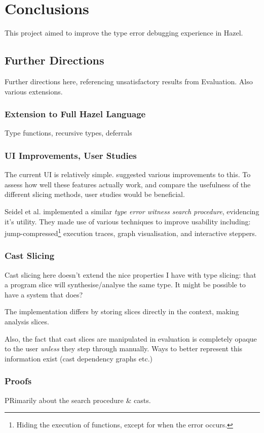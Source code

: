 \chapter{Conclusions}\label{chap:Conclusions}
This project aimed to improve the type error debugging experience in Hazel.

\section{Further Directions}
Further directions here, referencing unsatisfactory results from Evaluation. Also various extensions.
\subsection{Extension to Full Hazel Language}
Type functions, recursive types, deferrals

\subsection{UI Improvements, User Studies}
The current UI is relatively simple.  suggested various improvements to this. To assess how well these features actually work, and compare the usefulness of the different slicing methods, user studies would be beneficial.

Seidel et al. \cite{SearchProc} implemented a similar \textit{type error witness search procedure}, evidencing it's utility. They made use of various techniques to improve usability including: jump-compressed\footnote{Hiding the execution of functions, except for when the error occurs.} execution traces, graph visualisation, and interactive steppers.

\subsection{Cast Slicing}
Cast slicing here doesn't extend the nice properties I have with type slicing: that a program slice will synthesise/analyse the same type. It might be possible to have a system that does?

The implementation differs by storing slices directly in the context, making analysis slices.

Also, the fact that cast slices are manipulated in evaluation is completely opaque to the user \textit{unless} they step through manually. Ways to better represent this information exist (cast dependency graphs etc.)

\subsection{Proofs}
PRimarily about the search procedure \& casts. 

